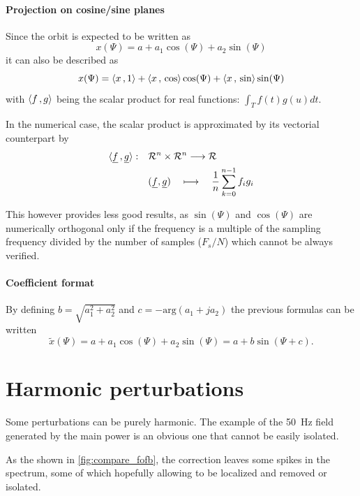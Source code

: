 \paragraph{Projection on cosine/sine planes}
Since the orbit is expected to be written as
\begin{equation*}
x(\Psi) = a+ a_1 \cos(\Psi) + a_2 \sin(\Psi)
\end{equation*}
it can also be described as
\begin{equation}
x(\Psi) = \langle x {\,,\,} 1 \rangle + \langle x {\,,\,} \cos \rangle \cos(\Psi) + \langle x {\,,\,} \sin \rangle \sin(\Psi)
\end{equation}
with $\langle f {\,,\,} g \rangle$ being the scalar product for real functions: $\int_T f(t)g(u)dt$.

In the numerical case, the scalar product is approximated by its vectorial counterpart by
\begin{align*}
\langle \underline{f} {\,,\,} \underline{g} \rangle: \quad
 &\mathcal{R}^n \times \mathcal{R}^n \longrightarrow \mathcal{R} \\
 & (\underline{f},\underline{g}) \quad\longmapsto \quad \frac{1}{n}\sum\limits_{k=0}^{n-1} f_i g_i
\end{align*}

This however provides less good results, as $\sin(\Psi)$ and $\cos(\Psi)$ are numerically orthogonal only if the frequency is a multiple of the sampling frequency divided by the number of samples ($F_s/N$) which cannot be always verified.

\paragraph{Coefficient format}
By defining $b = \sqrt{a_1^2+a_2^2}$ and $c = -\mathrm{arg}(a_1 + j a_2)$ the previous formulas can be written
\begin{equation*}
\tilde{x}(\Psi) = a + a_1 \cos(\Psi) + a_2 \sin(\Psi) = a + b \sin(\Psi + c).
\end{equation*}


\section{Harmonic perturbations}
Some perturbations can be purely harmonic. The example of the \SI{50}{\hertz} field generated by the main power is an obvious one that cannot be easily isolated. 

As the shown in \cref{fig:compare_fofb}, the correction leaves some spikes in the spectrum, some of which hopefully allowing to be localized and removed or isolated.

